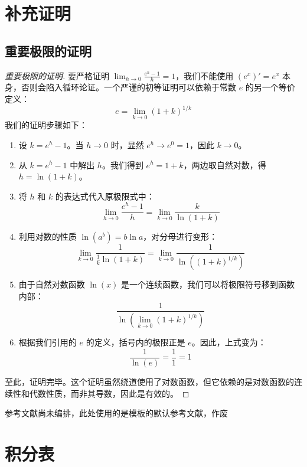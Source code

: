\documentclass[lang=cn,newtx,10pt,scheme=chinese]{elegantbook}
\begin{document}
\chapter{补充证明}

\section{重要极限的证明}\label{prf:ImtLim}
\begin{proof}[重要极限的证明]
  要严格证明 $\lim_{h \to 0} \frac{e^h - 1}{h} = 1$，我们不能使用 $(e^x)'=e^x$ 本身，否则会陷入循环论证。一个严谨的初等证明可以依赖于常数 $e$ 的另一个等价定义：
  \begin{equation}
    e = \lim_{k \to 0} (1+k)^{1/k}
  \end{equation}
  我们的证明步骤如下：
  \begin{enumerate}
    \item 设 $k = e^h - 1$。当 $h \to 0$ 时，显然 $e^h \to e^0 = 1$，因此 $k \to 0$。
    \item 从 $k = e^h - 1$ 中解出 $h$。我们得到 $e^h = 1+k$，两边取自然对数，得 $h = \ln(1+k)$。
    \item 将 $h$ 和 $k$ 的表达式代入原极限式中：
    \begin{equation}
      \lim_{h \to 0} \frac{e^h - 1}{h} = \lim_{k \to 0} \frac{k}{\ln(1+k)}
    \end{equation}
    \item 利用对数的性质 $\ln(a^b) = b\ln a$，对分母进行变形：
    \begin{equation}
      \lim_{k \to 0} \frac{1}{\frac{1}{k}\ln(1+k)} = \lim_{k \to 0} \frac{1}{\ln\left((1+k)^{1/k}\right)}
    \end{equation}
    \item 由于自然对数函数 $\ln(x)$ 是一个连续函数，我们可以将极限符号移到函数内部：
    \begin{equation}
      \frac{1}{\ln\left(\lim_{k \to 0}(1+k)^{1/k}\right)}
    \end{equation}
    \item 根据我们引用的 $e$ 的定义，括号内的极限正是 $e$。因此，上式变为：
    \begin{equation}
      \frac{1}{\ln(e)} = \frac{1}{1} = 1
    \end{equation}
  \end{enumerate}
  至此，证明完毕。这个证明虽然绕道使用了对数函数，但它依赖的是对数函数的连续性和代数性质，而非其导数，因此是有效的。
\end{proof}

\nocite{*}

\printbibliography[heading=bibintoc, title=\ebibname]
参考文献尚未编排，此处使用的是模板的默认参考文献，作废

\chapter{积分表}


\end{document}
